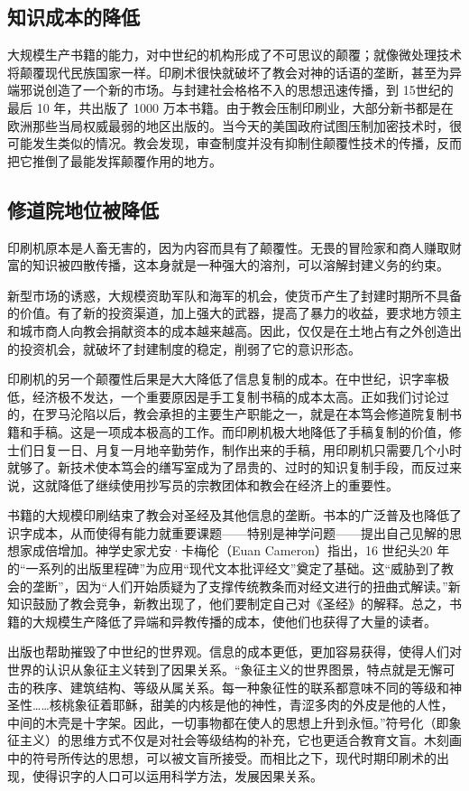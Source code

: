 \subsection{知识成本的降低}
大规模生产书籍的能力，对中世纪的机构形成了不可思议的颠覆；就像微处理技术将颠覆现代民族国家一样。印刷术很快就破坏了教会对神的话语的垄断，甚至为异端邪说创造了一个新的市场。与封建社会格格不入的思想迅速传播，到 15世纪的最后 10 年，共出版了 1000 万本书籍。由于教会压制印刷业，大部分新书都是在欧洲那些当局权威最弱的地区出版的。当今天的美国政府试图压制加密技术时，很可能发生类似的情况。教会发现，审查制度并没有抑制住颠覆性技术的传播，反而把它推倒了最能发挥颠覆作用的地方。

\subsection{修道院地位被降低}
印刷机原本是人畜无害的，因为内容而具有了颠覆性。无畏的冒险家和商人赚取财富的知识被四散传播，这本身就是一种强大的溶剂，可以溶解封建义务的约束。

新型市场的诱惑，大规模资助军队和海军的机会，使货币产生了封建时期所不具备的价值。有了新的投资渠道，加上强大的武器，提高了暴力的收益，要求地方领主和城市商人向教会捐献资本的成本越来越高。因此，仅仅是在土地占有之外创造出的投资机会，就破坏了封建制度的稳定，削弱了它的意识形态。

印刷机的另一个颠覆性后果是大大降低了信息复制的成本。在中世纪，识字率极低，经济极不发达，一个重要原因是手工复制书稿的成本太高。正如我们讨论过的，在罗马沦陷以后，教会承担的主要生产职能之一，就是在本笃会修道院复制书籍和手稿。这是一项成本极高的工作。而印刷机极大地降低了手稿复制的价值，修士们日复一日、月复一月地辛勤劳作，制作出来的手稿，用印刷机只需要几个小时就够了。新技术使本笃会的缮写室成为了昂贵的、过时的知识复制手段，而反过来说，这就降低了继续使用抄写员的宗教团体和教会在经济上的重要性。

书籍的大规模印刷结束了教会对圣经及其他信息的垄断。书本的广泛普及也降低了识字成本，从而使得有能力就重要课题——特别是神学问题——提出自己见解的思想家成倍增加。神学史家尤安·卡梅伦（Euan Cameron）指出，16 世纪头20 年的“一系列的出版里程碑”为应用“现代文本批评经文”奠定了基础。这“威胁到了教会的垄断”，因为“人们开始质疑为了支撑传统教条而对经文进行的扭曲式解读。”新知识鼓励了教会竞争，新教出现了，他们要制定自己对《圣经》的解释。总之，书籍的大规模生产降低了异端和异教传播的成本，使他们也获得了大量的读者。

出版也帮助摧毁了中世纪的世界观。信息的成本更低，更加容易获得，使得人们对世界的认识从象征主义转到了因果关系。“象征主义的世界图景，特点就是无懈可击的秩序、建筑结构、等级从属关系。每一种象征性的联系都意味不同的等级和神圣性……核桃象征着耶稣，甜美的内核是他的神性，青涩多肉的外皮是他的人性，中间的木壳是十字架。因此，一切事物都在使人的思想上升到永恒。”符号化（即象征主义）的思维方式不仅是对社会等级结构的补充，它也更适合教育文盲。木刻画中的符号所传达的思想，可以被文盲所接受。而相比之下，现代时期印刷术的出现，使得识字的人口可以运用科学方法，发展因果关系。

